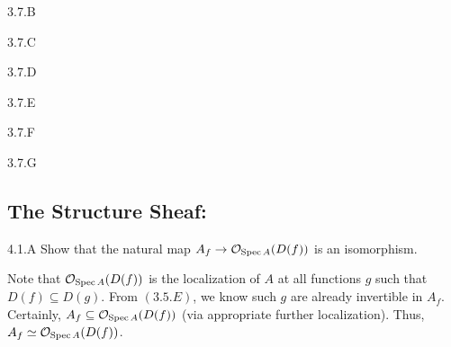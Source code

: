 \begin{exercise}{3.7.B}

\end{exercise}
\begin{solution}
    \todo{}
\end{solution}

\begin{exercise}{3.7.C}

\end{exercise}
\begin{solution}
    \todo{}
\end{solution}

\begin{exercise}{3.7.D}

\end{exercise}
\begin{solution}
    \todo{}
\end{solution}

\begin{exercise}{3.7.E}

\end{exercise}
\begin{solution}
    \todo{}
\end{solution}

\begin{exercise}{3.7.F}

\end{exercise}
\begin{solution}
    \todo{}
\end{solution}

\begin{exercise}{3.7.G}

\end{exercise}
\begin{solution}
    \todo{}
\end{solution}

\subsection{The Structure Sheaf: }
\begin{exercise}{4.1.A}
    Show that the natural map $A_f \to \mathcal{O}_{\operatorname{Spec} A}(D(f))$ is an isomorphism.
\end{exercise}
\begin{solution}
    Note that $\mathcal{O}_{\operatorname{Spec} A}(D(f))$ is the localization of $A$ at all functions $g$ such that $D(f) \subseteq D(g)$. From $(3.5.E)$, we know such $g$ are already invertible in $A_f$. Certainly, $A_f \subseteq \mathcal{O}_{\operatorname{Spec} A}(D(f))$ (via appropriate further localization). Thus, $A_f \simeq \mathcal{O}_{\operatorname{Spec} A}(D(f))$.
\end{solution}

